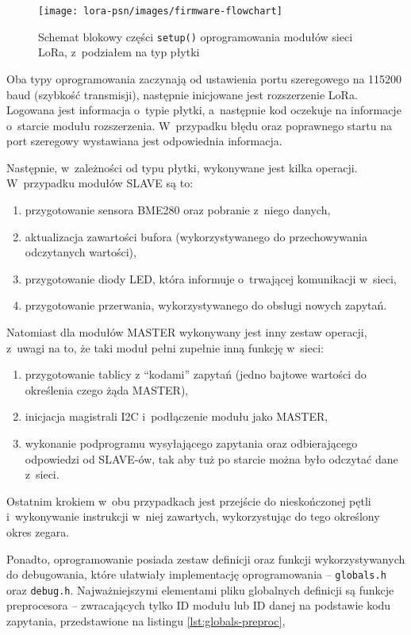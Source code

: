 \begin{figure}[!htbp]
    \centering
    \texttt{[image: lora-psn/images/firmware-flowchart]}
    \caption{\label{img:firmware-flowchart}Schemat blokowy części \texttt{setup()} oprogramowania modułów sieci LoRa,
        z~podziałem na typ płytki}
\end{figure}

Oba typy oprogramowania zaczynają od ustawienia portu szeregowego na 115200 baud (szybkość transmisji), następnie
inicjowane jest rozszerzenie LoRa. Logowana jest informacja o~typie płytki, a~następnie kod oczekuje na informacje
o~starcie modułu rozszerzenia. W~przypadku błędu oraz poprawnego startu na port szeregowy wystawiana jest odpowiednia
informacja.

Następnie, w~zależności od typu płytki, wykonywane jest kilka operacji. W~przypadku modułów SLAVE są to:
\begin{enumerate}
    \item przygotowanie sensora BME280 oraz pobranie z~niego danych,
    \item aktualizacja zawartości bufora (wykorzystywanego do przechowywania odczytanych wartości),
    \item przygotowanie diody LED, która informuje o~trwającej komunikacji w~sieci,
    \item przygotowanie przerwania, wykorzystywanego do obsługi nowych zapytań.
\end{enumerate}

Natomiast dla modułów MASTER wykonywany jest inny zestaw operacji, z~uwagi na to, że taki moduł pełni zupełnie inną
funkcję w~sieci:
\begin{enumerate}
    \item przygotowanie tablicy z \enquote{kodami} zapytań (jedno bajtowe wartości do określenia czego żąda MASTER),
    \item inicjacja magistrali I2C i~podłączenie modułu jako MASTER,
    \item wykonanie podprogramu wysyłającego zapytania oraz odbierającego odpowiedzi od SLAVE-ów, tak aby tuż po
          starcie można było odczytać dane z~sieci.
\end{enumerate}
Ostatnim krokiem w~obu przypadkach jest przejście do nieskończonej pętli i~wykonywanie instrukcji w~niej zawartych,
wykorzystując do tego określony okres zegara.

Ponadto, oprogramowanie posiada zestaw definicji oraz funkcji wykorzystywanych do debugowania, które ułatwiały
implementację oprogramowania -- \texttt{globals.h} oraz \texttt{debug.h}. Najważniejszymi elementami pliku globalnych
definicji są funkcje preprocesora -- zwracających tylko ID modułu lub ID danej na podstawie kodu zapytania,
przedstawione na listingu \ref{lst:globals-preproc},

